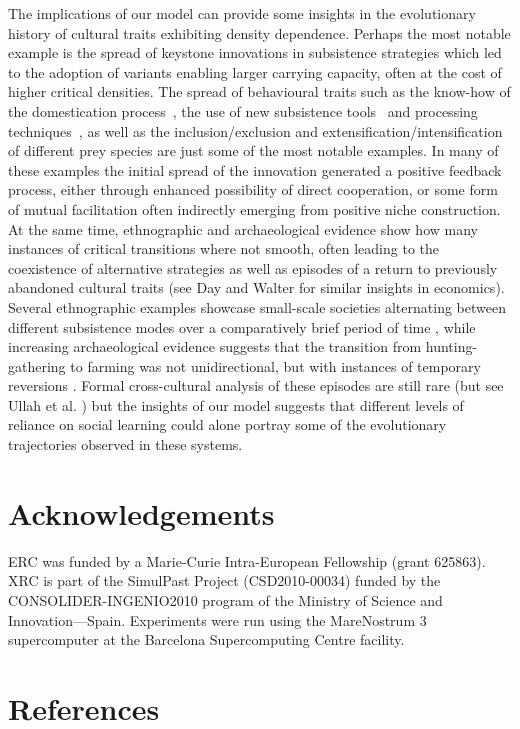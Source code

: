 \documentclass[review,authoryear]{elsarticle}
\begin{document}
The implications of our model can provide some insights in the evolutionary history of cultural traits exhibiting density dependence. Perhaps the most notable example is the spread of keystone innovations in subsistence strategies which led to the adoption of variants enabling larger carrying capacity, often at the cost of higher critical densities. The spread of behavioural traits such as the know-how of the domestication process~\citep{barker2006}, the use of new subsistence tools~\citep{petraglia_population_2009} and processing techniques~\citep{molleson1993}, as well as the inclusion/exclusion and extensification/intensification of different prey species are just some of the most notable examples. In many of these examples the initial spread of the innovation generated a positive feedback process, either through enhanced possibility of direct cooperation, or some form of mutual facilitation often indirectly emerging from positive niche construction. At the same time, ethnographic and archaeological evidence show how many instances of critical transitions where not smooth, often leading to the coexistence of alternative strategies as well as episodes of a return to previously abandoned cultural traits (see Day and Walter \citeyear{day_and_walter_1989} for similar insights in economics). Several ethnographic examples showcase small-scale societies alternating between different subsistence modes over a comparatively brief period of time \citep{layton1991,mace_1993,oota_et_al_2005}, while increasing archaeological evidence suggests that the transition from hunting-gathering to farming was not unidirectional, but with instances of temporary reversions \citep{rowley2001,stevens_fuller_2012}. Formal cross-cultural analysis of these episodes are still rare (but see Ullah et al. \citeyear{ullah_etal_2015}) but the insights of our model suggests that different levels of reliance on social learning could alone portray some of the evolutionary trajectories observed in these systems. 

\section{Acknowledgements}

ERC was funded by a Marie-Curie Intra-European Fellowship (grant 625863). XRC is part of the SimulPast Project (CSD2010-00034) funded by the CONSOLIDER-INGENIO2010 program of the Ministry of Science and Innovation—Spain. Experiments were run using the MareNostrum 3 supercomputer at the Barcelona Supercomputing Centre facility.

\section{References}



\end{document}
